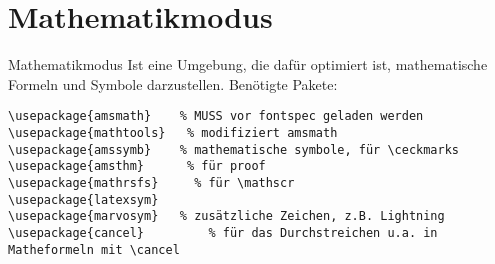 \section{Mathematikmodus}

\begin{frame}[fragile]{Mathematikmodus}
Ist eine Umgebung, die dafür optimiert ist, mathematische Formeln und Symbole darzustellen.
Benötigte Pakete:
\begin{lstlisting}[style=tex]
\usepackage{amsmath}    % MUSS vor fontspec geladen werden
\usepackage{mathtools}   % modifiziert amsmath
\usepackage{amssymb}    % mathematische symbole, für \ceckmarks
\usepackage{amsthm}      % für proof
\usepackage{mathrsfs}     % für \mathscr
\usepackage{latexsym}
\usepackage{marvosym}   % zusätzliche Zeichen, z.B. Lightning
\usepackage{cancel}         % für das Durchstreichen u.a. in Matheformeln mit \cancel
\end{lstlisting}
\end{frame}



